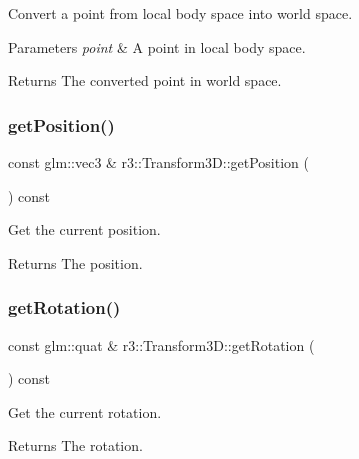 Convert a point from local body space into world space. 


\begin{DoxyParams}{Parameters}
{\em point} & A point in local body space. \\
\hline
\end{DoxyParams}
\begin{DoxyReturn}{Returns}
The converted point in world space. 
\end{DoxyReturn}
\mbox{\label{classr3_1_1_transform3_d_abe9ff86c845d54cd297ff00fd21aad71}} 
\subsubsection{\texorpdfstring{get\+Position()}{getPosition()}}
{\footnotesize\ttfamily const glm\+::vec3 \& r3\+::\+Transform3\+D\+::get\+Position (\begin{DoxyParamCaption}{ }\end{DoxyParamCaption}) const}



Get the current position. 

\begin{DoxyReturn}{Returns}
The position. 
\end{DoxyReturn}
\mbox{\label{classr3_1_1_transform3_d_a0a6737bc120cbcd7ae16801291478a35}} 
\subsubsection{\texorpdfstring{get\+Rotation()}{getRotation()}}
{\footnotesize\ttfamily const glm\+::quat \& r3\+::\+Transform3\+D\+::get\+Rotation (\begin{DoxyParamCaption}{ }\end{DoxyParamCaption}) const}



Get the current rotation. 

\begin{DoxyReturn}{Returns}
The rotation. 
\end{DoxyReturn}
\mbox{\label{classr3_1_1_transform3_d_ac9c80563cfca63791987f04639cff411}} 
